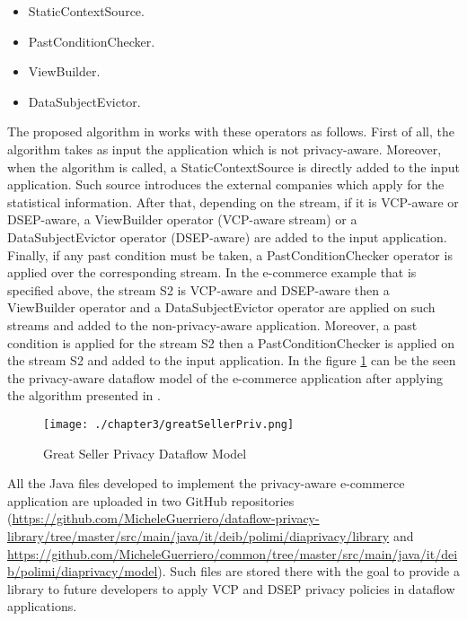 \begin{itemize}
\item StaticContextSource.
\item PastConditionChecker.
\item ViewBuilder.
\item DataSubjectEvictor.
\end{itemize}

The proposed algorithm in \cite{privacypoliciesarticle} works with these operators as follows. First of all, the algorithm takes as input the application which is not privacy-aware. Moreover, when the algorithm is called, a StaticContextSource is directly added to the input application. Such source introduces the external companies which apply for the statistical information. After that, depending on the stream, if it is VCP-aware or DSEP-aware, a ViewBuilder operator (VCP-aware stream) or a DataSubjectEvictor operator (DSEP-aware) are added to the input application. Finally, if any past condition must be taken, a PastConditionChecker operator is applied over the corresponding stream. In the e-commerce example that is specified above, the stream S2 is VCP-aware and DSEP-aware then a ViewBuilder operator and a DataSubjectEvictor operator are applied on such streams and added to the non-privacy-aware application. Moreover, a past condition is applied for the stream S2 then a PastConditionChecker is applied on the stream S2 and added to the input application. In the figure \ref{fig:Great Seller Privacy Dataflow Model} can be the seen the privacy-aware dataflow model of the e-commerce application after applying the algorithm presented in \cite{privacypoliciesarticle}.

\begin{figure}
\centering
{\texttt{[image: ./chapter3/greatSellerPriv.png]}}
\caption{Great Seller Privacy Dataflow Model}
\label{fig:Great Seller Privacy Dataflow Model}
\end{figure}

All the Java files developed to implement the privacy-aware e-commerce application are uploaded in two GitHub repositories (\url{https://github.com/MicheleGuerriero/dataflow-privacy-library/tree/master/src/main/java/it/deib/polimi/diaprivacy/library} and \url{https://github.com/MicheleGuerriero/common/tree/master/src/main/java/it/deib/polimi/diaprivacy/model}). Such files are stored there with the goal to provide a library to future developers to apply VCP and DSEP privacy policies in dataflow applications.

